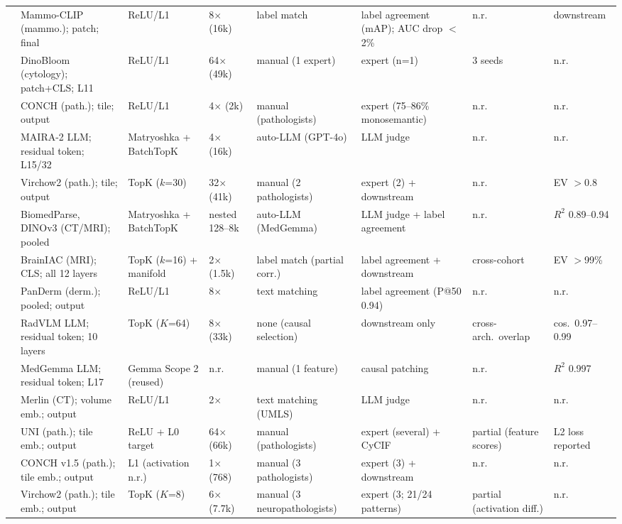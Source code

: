 \begin{table}
\begin{tabular}{@{}L{2.80cm}L{3.85cm}L{2.51cm}L{1.73cm}L{2.26cm}L{2.93cm}L{1.73cm}L{1.46cm}@{}}
\cite{nakka2025mammosae} & Mammo-CLIP (mammo.); patch; final & ReLU/L1 & 8$\times$ (16k) & label match & label agreement (mAP); AUC drop $<$2\% & n.r. & downstream \\
\cite{dasdelen2025cytosae} & DinoBloom (cytology); patch+CLS; L11 & ReLU/L1 & 64$\times$ (49k) & manual (1 expert) & expert (n=1) & 3 seeds & n.r. \\
\cite{sun2025prototypebased} & CONCH (path.); tile; output & ReLU/L1 & 4$\times$ (2k) & manual (pathologists) & expert (75--86\% monosemantic) & n.r. & n.r. \\
\cite{bouzid2025insights} & MAIRA-2 LLM; residual token; L15/32 & Matryoshka + BatchTopK & 4$\times$ (16k) & auto-LLM (GPT-4o) & LLM judge & n.r. & n.r. \\
\cite{kim2026dissecting} & Virchow2 (path.); tile; output & TopK ($k$=30) & 32$\times$ (41k) & manual (2 pathologists) & expert (2) + downstream & n.r. & EV $>$0.8 \\
\cite{wesp2026sparse} & BiomedParse, DINOv3 (CT/MRI); pooled & Matryoshka + BatchTopK & nested 128--8k & auto-LLM (MedGemma) & LLM judge + label agreement & n.r. & $R^2$ 0.89--0.94 \\
\cite{nerrise2026geosae} & BrainIAC (MRI); CLS; all 12 layers & TopK ($k$=16) + manifold & 2$\times$ (1.5k) & label match (partial corr.) & label agreement + downstream & cross-cohort & EV $>$99\% \\
\cite{yan2026a} & PanDerm (derm.); pooled; output & ReLU/L1 & 8$\times$ & text matching & label agreement (P@50 0.94) & n.r. & n.r. \\
\cite{nooralahzadeh2026universal} & RadVLM LLM; residual token; 10 layers & TopK ($K$=64) & 8$\times$ (33k) & none (causal selection) & downstream only & cross-arch.\ overlap & cos.\ 0.97--0.99 \\
\cite{sadanandan2026mechanistically} & MedGemma LLM; residual token; L17 & Gemma Scope 2 (reused) & n.r. & manual (1 feature) & causal patching & n.r. & $R^2$ 0.997 \\
\cite{haque2026medconcept} & Merlin (CT); volume emb.; output & ReLU/L1 & 2$\times$ & text matching (UMLS) & LLM judge & n.r. & n.r. \\
\cite{zhao2026compositional} & UNI (path.); tile emb.; output & ReLU + L0 target & 64$\times$ (66k) & manual (pathologists) & expert (several) + CyCIF & partial (feature scores) & L2 loss reported \\
\cite{bisson2026unsupervised} & CONCH v1.5 (path.); tile emb.; output & L1 (activation n.r.) & 1$\times$ (768) & manual (3 pathologists) & expert (3) + downstream & n.r. & n.r. \\
\cite{redlich2026explainable} & Virchow2 (path.); tile emb.; output & TopK ($K$=8) & 6$\times$ (7.7k) & manual (3 neuropathologists) & expert (3; 21/24 patterns) & partial (activation diff.) & n.r. \\
\bottomrule
\end{tabular}
\end{table}
